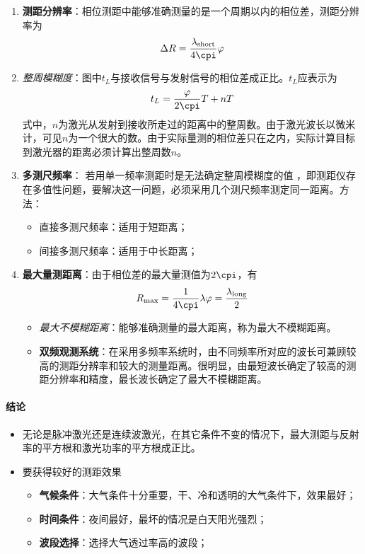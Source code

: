 \begin{enumerate}
	\item \textbf{测距分辨率}：相位测距中能够准确测量的是一个周期以内的相位差，测距分辨率为
		\begin{equation}
		\Delta R = \dfrac{\lambda_{\text{short}}}{4\cpi}\varphi
		\end{equation}
	\item \textit{整周模糊度}：图中$ t_L $与接收信号与发射信号的相位差成正比。$ t_L $应表示为
		\begin{equation}
		t_L = \dfrac{\varphi}{2\cpi}T+nT
		\end{equation}
		式中，$ n $为激光从发射到接收所走过的距离中的整周数。由于激光波长以微米计，可见$ n $为一个很大的数。由于实际量测的相位差只在之内，实际计算目标到激光器的距离必须计算出整周数$ n $。
	\item \textbf{多测尺频率}：
		若用单一频率测距时是无法确定整周模糊度的值 ，即测距仪存在多值性问题，要解决这一问题，必须采用几个测尺频率测定同一距离。方法：
		\begin{itemize}
			\item 直接多测尺频率：适用于短距离；
			\item 间接多测尺频率：适用于中长距离；
		\end{itemize} %
	\item \textbf{最大量测距离}：由于相位差的最大量测值为$ 2\cpi $，有
		\begin{equation}
		R_{\max} = \dfrac{1}{4\cpi}\lambda\varphi = \dfrac{\lambda_{\text{long}}}{2}
		\end{equation}
		\begin{itemize}
			\item \textit{最大不模糊距离}：能够准确测量的最大距离，称为最大不模糊距离。
			\item \textbf{双频观测系统}：在采用多频率系统时，由不同频率所对应的波长可兼顾较高的测距分辨率和较大的测量距离。很明显，由最短波长确定了较高的测距分辨率和精度，最长波长确定了最大不模糊距离。
		\end{itemize}
\end{enumerate} %

\paragraph{结论}
\begin{itemize}
	\item 无论是脉冲激光还是连续波激光，在其它条件不变的情况下，最大测距与反射率的平方根和激光功率的平方根成正比。
	\item 要获得较好的测距效果
		\begin{itemize}
			\item \textbf{气候条件}：大气条件十分重要，干、冷和透明的大气条件下，效果最好；
			\item \textbf{时间条件}：夜间最好，最坏的情况是白天阳光强烈；
			\item \textbf{波段选择}：选择大气透过率高的波段；
		\end{itemize}
\end{itemize}

